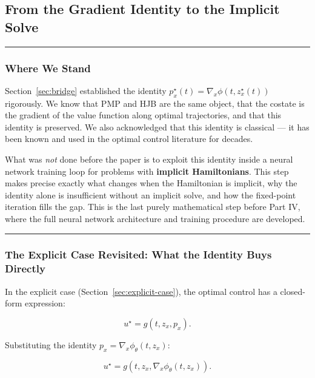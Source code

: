\documentclass{article}
\begin{document}
\subsection{From the Gradient Identity to the Implicit Solve}
\label{sec:implicit-solve}

\medskip\hrule\medskip

\subsubsection{Where We Stand}

\begin{tldrbox}
Section~\ref{sec:bridge} established the identity $p_x^\star(t) = \nabla_x \phi(t, z_x^\star(t))$
rigorously. We know that PMP and HJB are the same object, that the costate is
the gradient of the value function along optimal trajectories, and that this
identity is preserved. We
also acknowledged that this identity is classical --- it has been known and used
in the optimal control literature for decades.

What was \textit{not} done before the paper is to exploit this identity inside
a neural network training loop for problems with \textbf{implicit Hamiltonians}.
This step makes precise exactly what changes when the Hamiltonian is implicit,
why the identity alone is insufficient without an implicit solve, and how
the fixed-point iteration fills the gap. This is the last purely mathematical step before
Part IV, where the full neural network architecture and training procedure are
developed.
\end{tldrbox}

\medskip\hrule\medskip

\subsubsection{The Explicit Case Revisited: What the Identity Buys Directly}

In the explicit case (Section~\ref{sec:explicit-case}), the optimal control has a closed-form expression:

\begin{equation}
    u^\star = g(t, z_x, p_x).
\end{equation}

Substituting the identity $p_x = \nabla_x \phi_\theta(t, z_x)$:

\begin{equation}
    u^\star = g(t, z_x, \nabla_x \phi_\theta(t, z_x)).
    \label{eq:explicit_substitution}
\end{equation}
\end{document}
